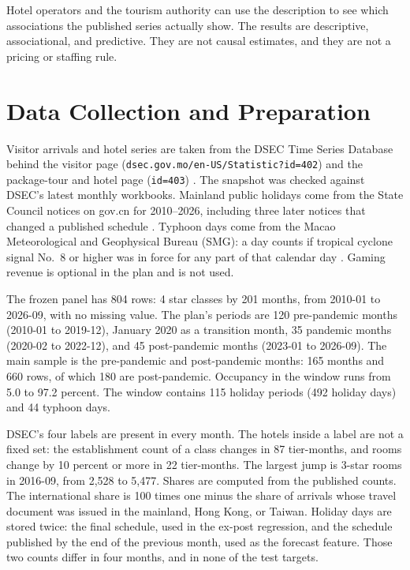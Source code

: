 \documentclass[11pt,a4paper]{article}
\begin{document}
Hotel operators and the tourism authority can use the description to see which associations the published series actually show. The results are descriptive, associational, and predictive. They are not causal estimates, and they are not a pricing or staffing rule.

\section{Data Collection and Preparation}
Visitor arrivals and hotel series are taken from the DSEC Time Series Database behind the visitor page (\texttt{dsec.gov.mo/en-US/Statistic?id=402}) \cite{dsec_visitors} and the package-tour and hotel page (\texttt{id=403}) \cite{dsec_hotels}. The snapshot was checked against DSEC's latest monthly workbooks. Mainland public holidays come from the State Council notices on gov.cn for 2010--2026, including three later notices that changed a published schedule \cite{statecouncil_holidays}. Typhoon days come from the Macao Meteorological and Geophysical Bureau (SMG): a day counts if tropical cyclone signal No.~8 or higher was in force for any part of that calendar day \cite{smg_tc}. Gaming revenue is optional in the plan and is not used.

The frozen panel has 804 rows: 4 star classes by 201 months, from 2010-01 to 2026-09, with no missing value. The plan's periods are 120 pre-pandemic months (2010-01 to 2019-12), January 2020 as a transition month, 35 pandemic months (2020-02 to 2022-12), and 45 post-pandemic months (2023-01 to 2026-09). The main sample is the pre-pandemic and post-pandemic months: 165 months and 660 rows, of which 180 are post-pandemic. Occupancy in the window runs from 5.0 to 97.2 percent. The window contains 115 holiday periods (492 holiday days) and 44 typhoon days.

DSEC's four labels are present in every month. The hotels inside a label are not a fixed set: the establishment count of a class changes in 87 tier-months, and rooms change by 10 percent or more in 22 tier-months. The largest jump is 3-star rooms in 2016-09, from 2,528 to 5,477. Shares are computed from the published counts. The international share is 100 times one minus the share of arrivals whose travel document was issued in the mainland, Hong Kong, or Taiwan. Holiday days are stored twice: the final schedule, used in the ex-post regression, and the schedule published by the end of the previous month, used as the forecast feature. Those two counts differ in four months, and in none of the test targets.
\end{document}
